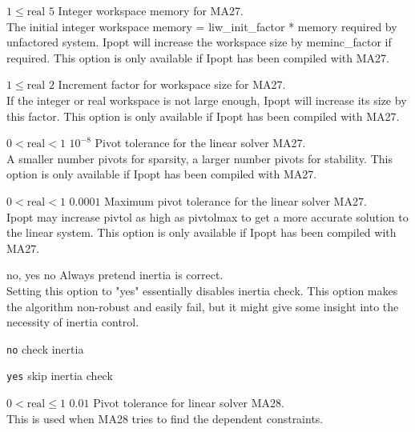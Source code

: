 %
{$1\leq\textrm{real}$}%
{$5$}%
{Integer workspace memory for MA27.\\
The initial integer workspace memory = liw\_init\_factor * memory required by unfactored system. Ipopt will increase the workspace size by meminc\_factor if required.  This option is only available if Ipopt has been compiled with MA27.}%
{}

%
{$1\leq\textrm{real}$}%
{$2$}%
{Increment factor for workspace size for MA27.\\
If the integer or real workspace is not large enough, Ipopt will increase its size by this factor.  This option is only available if Ipopt has been compiled with MA27.}%
{}

%
{$0<\textrm{real}<1$}%
{$10^{- 8}$}%
{Pivot tolerance for the linear solver MA27.\\
A smaller number pivots for sparsity, a larger number pivots for stability.  This option is only available if Ipopt has been compiled with MA27.}%
{}

%
{$0<\textrm{real}<1$}%
{$0.0001$}%
{Maximum pivot tolerance for the linear solver MA27.\\
Ipopt may increase pivtol as high as pivtolmax to get a more accurate solution to the linear system.  This option is only available if Ipopt has been compiled with MA27.}%
{}

%
{\ttfamily no, yes}%
{no}%
{Always pretend inertia is correct.\\
Setting this option to "yes" essentially disables inertia check. This option makes the algorithm non-robust and easily fail, but it might give some insight into the necessity of inertia control.}%
{\begin{list}{}{
\setlength{\parsep}{0em}
\setlength{\leftmargin}{5ex}
\setlength{\labelwidth}{2ex}
\setlength{\itemindent}{0ex}
\setlength{\topsep}{0pt}}
\item[\texttt{no}] check inertia
\item[\texttt{yes}] skip inertia check
\end{list}
}

%
{$0<\textrm{real}\leq1$}%
{$0.01$}%
{Pivot tolerance for linear solver MA28.\\
This is used when MA28 tries to find the dependent constraints.}%
{}

